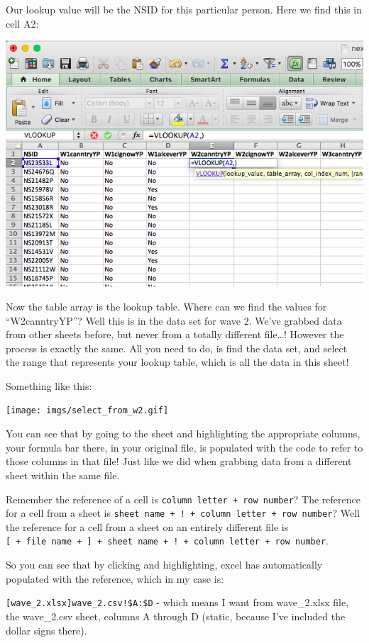 \documentclass[]{book}
\theoremstyle{definition}
\theoremstyle{definition}
\theoremstyle{definition}
\theoremstyle{remark}
\begin{document}
Our lookup value will be the NSID for this particular person. Here we
find this in cell A2:

\includegraphics{imgs/lookup_val_nsid.png}

Now the table array is the lookup table. Where can we find the values
for ``W2canntryYP''? Well this is in the data set for wave 2. We've
grabbed data from other sheets before, but never from a totally
different file\ldots{}! However the process is exactly the same. All you
need to do, is find the data set, and select the range that represents
your lookup table, which is all the data in this sheet!

Something like this:

\texttt{[image: imgs/select\_from\_w2.gif]}

You can see that by going to the sheet and highlighting the appropriate
columns, your formula bar there, in your original file, is populated
with the code to refer to those columns in that file! Just like we did
when grabbing data from a different sheet within the same file.

Remember the reference of a cell is
\texttt{column\ letter\ +\ row\ number}? The reference for a cell from a
sheet is \texttt{sheet\ name\ +\ !\ +\ column\ letter\ +\ row\ number}?
Well the reference for a cell from a sheet on an entirely different file
is
\texttt{{[}\ +\ file\ name\ +\ {]}\ +\ sheet\ name\ +\ !\ +\ column\ letter\ +\ row\ number}.

So you can see that by clicking and highlighting, excel has
automatically populated with the reference, which in my case is:

\texttt{{[}wave\_2.xlsx{]}wave\_2.csv!\$A:\$D} - which means I want from
wave\_2.xlsx file, the wave\_2.csv sheet, columns A through D (static,
because I've included the dollar signs there).
\end{document}

